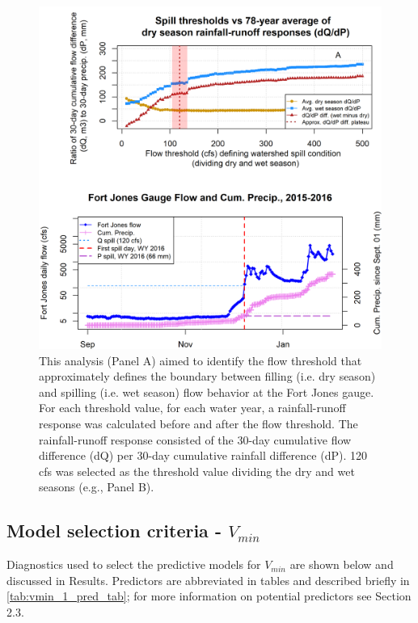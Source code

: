 \documentclass[hess, manuscript]{copernicus}
\begin{document}
\begin{figure}
\includegraphics[width=1\linewidth]{f10} \caption{\label{fig:qspill_figs} This analysis (Panel A) aimed to identify the flow threshold that approximately defines the boundary between filling (i.e. dry season) and spilling (i.e. wet season) flow behavior at the Fort Jones gauge. For each threshold value, for each water year, a rainfall-runoff response was calculated before and after the flow threshold. The rainfall-runoff response consisted of the 30-day cumulative flow difference (dQ) per 30-day cumulative rainfall difference (dP). 120 cfs was selected as the threshold value dividing the dry and wet seasons (e.g., Panel B).}\label{fig:qspill_figs}
\end{figure}

\newpage

\subsection{\texorpdfstring{Model selection criteria -
\(V_{min}\)}{Model selection criteria - V\_\{min\}}}

Diagnostics used to select the predictive models for \(V_{min}\) are
shown below and discussed in Results. Predictors are abbreviated in
tables and described briefly in \autoref{tab:vmin_1_pred_tab}; for more
information on potential predictors see Section 2.3.
\end{document}
